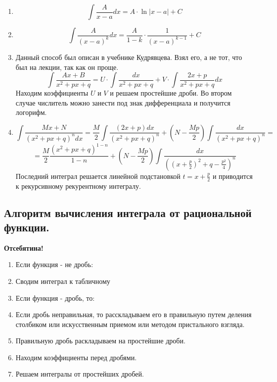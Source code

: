 \documentclass[a4paper,12pt]{article}
\theoremstyle{plain} %
\theoremstyle{definition} %
\theoremstyle{remark} %
\begin{document}
\begin{enumerate}
	\item \[ \int \frac{A}{x - a}dx = A \cdot \ln|x - a| + C \]
	\item \[ \int \frac{A}{(x-a)^k}dx = \frac{A}{1 - k} \cdot \frac{1}{(x - a)^{k - 1}} + C \]
	\item Данный способ был описан в учебнике Кудрявцева. Взял его, а не тот, что был на лекции, так как он проще.
	      \[ \int \frac{Ax + B}{x^2 + px + q} = U \cdot \int \frac{dx}{x^2 + px + q} + V \cdot \int \frac{2x + p}{x^2 + px + q}dx \]
	      Находим коэффициенты $U$ и $V$ и решаем простейшие дроби. Во втором случае числитель можно занести под знак дифференциала и получится логорифм.
	\item \[ \int  \frac{Mx + N}{(x^2 + px + q)^n dx} = \frac{M}{2} \int \frac{(2x + p)dx}{(x^2 + px + q)^n} + \left( N - \frac{Mp}{2} \right) \int \frac{dx}{(x^2 + px + q)^n} =   \]
	      \[ = \frac{M}{2} \frac{(x^2 + px + q)^{1 - n}}{1 - n} + \left( N - \frac{Mp}{2} \right) \int \frac{dx}{\left( (x + \frac{p}{2})^2  + q - \frac{p^2}{4}\right)^n}  \]
	      Последний интеграл решается линейной подстановкой $t = x + \frac{p}{2}$ и приводится к рекурсивному рекурентному интегралу.
\end{enumerate}

\newpage
\subsection*{Алгоритм вычисления интеграла от рациональной функции.}

\textbf{Отсебятина!}

\begin{enumerate}
	\item Если функция - не дробь:
	\item Сводим интеграл к табличному
	\item Если функция - дробь, то:
	\item Если дробь неправильная, то расскладываем его в правильную путем деления столбиком или искусственным приемом или методом пристального взгляда.
	\item Правильную дробь раскладываем на простейшие дроби.
	\item Находим коэффициенты перед дробями.
	\item Решаем интегралы от простейших дробей.
\end{enumerate}
\end{document}
